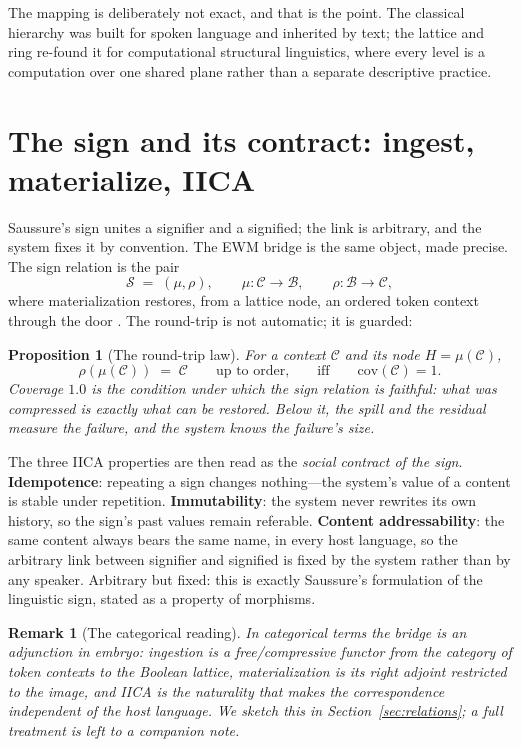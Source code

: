 \documentclass[11pt,a4paper]{article}
\newtheorem{proposition}[principle]{Proposition}
\newtheorem{remark}[principle]{Remark}
\theoremstyle{remark}
\newcommand{\Lat}{\ensuremath{\mathcal{B}}}              %
\newcommand{\HLL}{\ensuremath{H}}                        %
\newcommand{\Ctx}{\ensuremath{\mathcal{C}}}              %
\newcommand{\Ing}{\ensuremath{\mu}}                      %
\newcommand{\Mat}{\ensuremath{\rho}}                     %
\newcommand{\Sign}{\ensuremath{\mathcal{S}}}             %
\newcommand{\Cov}{\ensuremath{\mathrm{cov}}}             %
\begin{document}
The mapping is deliberately not exact, and that is the point. The classical
hierarchy was built for spoken language and inherited by text; the lattice and
ring re-found it for computational structural linguistics, where every level is
a computation over one shared plane rather than a separate descriptive
practice.

\section{The sign and its contract: ingest, materialize, IICA}
\label{sec:sign}

Saussure's sign unites a signifier and a signified; the link is arbitrary, and
the system fixes it by convention. The EWM bridge is the same object, made
precise. The sign relation is the pair
\[
  \Sign \;=\; (\Ing, \Mat),
  \qquad
  \Ing : \Ctx \to \Lat, \qquad \Mat : \Lat \to \Ctx,
\]
where materialization restores, from a lattice node, an ordered token context
through the door \cite{attention2026}. The round-trip is not automatic; it is
guarded:

\begin{proposition}[The round-trip law]
For a context $\Ctx$ and its node $\HLL = \Ing(\Ctx)$,
\[
  \Mat(\Ing(\Ctx)) \;=\; \Ctx
  \qquad\text{up to order,}\qquad
  \text{iff}\qquad \Cov(\Ctx) = 1 .
\]
Coverage $1.0$ is the condition under which the sign relation is faithful:
what was compressed is exactly what can be restored. Below it, the spill and
the residual measure the failure, and the system knows the failure's size.
\end{proposition}

The three IICA properties are then read as the \emph{social contract of the
sign}. \textbf{Idempotence}: repeating a sign changes nothing---the system's
value of a content is stable under repetition. \textbf{Immutability}: the
system never rewrites its own history, so the sign's past values remain
referable. \textbf{Content addressability}: the same content always bears the
same name, in every host language, so the arbitrary link between signifier and
signified is fixed by the system rather than by any speaker. Arbitrary but
fixed: this is exactly Saussure's formulation of the linguistic sign, stated
as a property of morphisms.

\begin{remark}[The categorical reading]
In categorical terms the bridge is an adjunction in embryo: ingestion is a
free/compressive functor from the category of token contexts to the Boolean
lattice, materialization is its right adjoint restricted to the image, and
IICA is the naturality that makes the correspondence independent of the host
language. We sketch this in Section~\ref{sec:relations}; a full treatment is
left to a companion note.
\end{remark}
\end{document}
